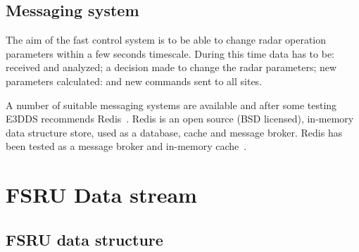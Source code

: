 \documentclass[12pt,a4paper]{article}
\begin{document}
\subsection{Messaging system}
The aim of the fast control system is to be able to change radar operation parameters within a few seconds timescale. 
During this time data has to be: received and analyzed; a decision made to change the radar parameters; new parameters calculated: and new commands sent to all sites. 

A number of suitable messaging systems are available and after some testing E3DDS recommends Redis~\cite{redis}. Redis is an open source (BSD licensed), in-memory data structure store, used as a database, cache and message broker. 
Redis has been tested as a message broker and in-memory cache~\cite{redis-testing}.


\section{FSRU Data stream}


\subsection{FSRU data structure}
\end{document}
